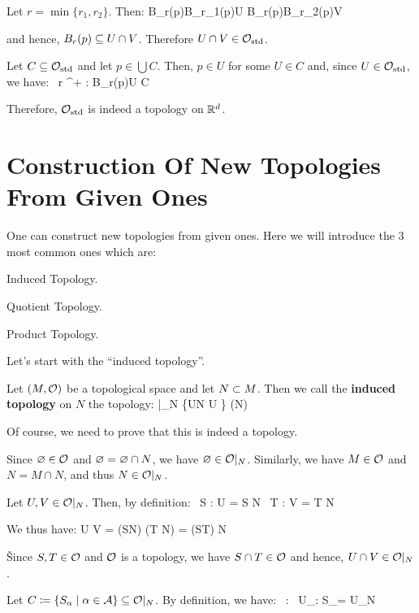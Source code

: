 Let $r=\min\{r_1,r_2\}$. Then:
\bse
B_r(p)\se B_{r_1}(p)\se U \quad \land \quad B_r(p)\se B_{r_2}(p)\se V
\ese

and hence, $B_r(p)\se U \cap V$. Therefore $U\cap V \in \cO_\mathrm{std}$.
\item[iii)] Let $C \se \cO_\mathrm{std}$ and let $p \in \bigcup C$. Then, $p\in U$ for some $U \in C$ and, since $U
\in \cO_\mathrm{std}$, we have:
\bse
\exists \, r \in \R^+ : B_r(p)\se U \se \bigcup C
\ese
\een

Therefore, $\cO_\mathrm{std}$ is indeed a topology on $\R^d$.
\eq

\section{Construction Of New Topologies From Given Ones}

One can construct new topologies from given ones. Here we will introduce the 3 most common ones which are:
\bit
\item Induced Topology.
\item Quotient Topology.
\item Product Topology.
\eit

Let's start with the ``induced topology''.

Let $(M,\cO)$ be a topological space and let $N\ss M$. Then we call the \textbf{induced topology} on $N$ the topology:
\bse
\cO|_N \coloneqq \{U\cap N \mid U \in \cO\} \se \cP(N)
\ese
\ed

Of course, we need to prove that this is indeed a topology.

\bq
\ben
\item[i)] Since $\vn \in \cO$ and $\vn = \vn \cap N$, we have $\vn \in \cO|_N$. Similarly, we have $M \in \cO$ and $N
= M \cap N$, and thus $N \in \cO|_N$.
\item[ii)] Let $U,V \in \cO|_N$. Then, by definition:
\bse
\exists \, S \in \cO : U = S \cap N \quad \land \quad \exists \, T \in \cO : V = T \cap N
\ese

We thus have:
\bse
U \cap V = (S\cap N) \cap (T \cap N) = (S\cap T) \cap N
\ese

\v

Since $S,T\in \cO$ and $\cO$ is a topology, we have $S\cap T \in \cO$ and hence, $U\cap V \in \cO|_N$.
\item[iii)] Let $C \coloneqq \{S_\a\mid \a \in \cA\} \se \cO|_N$. By definition, we have:
\bse
\forall \, \a \in \cA : \exists \, U_\a \in \cO : S_\a = U_\a \cap N
\ese

